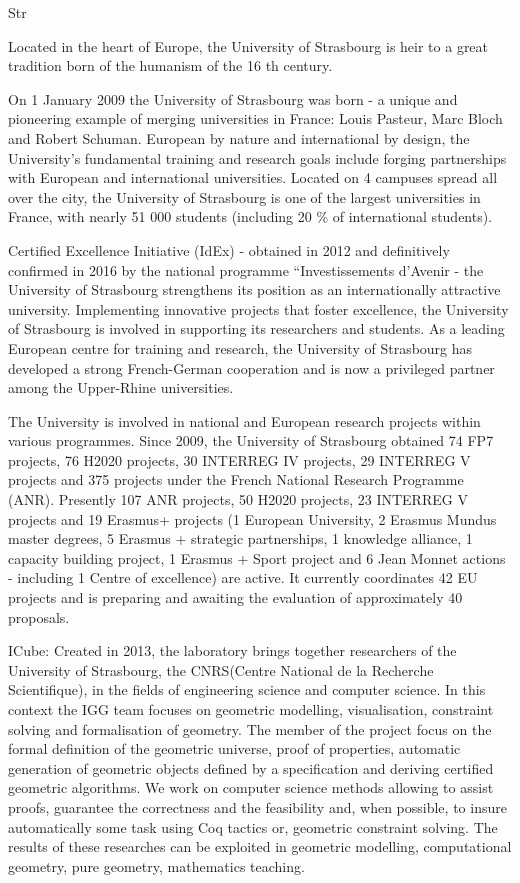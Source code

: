 \begin{sitedescription}{Str}


Located in the heart of Europe, the University of Strasbourg is heir to a great tradition born of
the humanism of the 16 th century.

On 1 January 2009 the University of Strasbourg was born - a unique and pioneering
example of merging universities in France: Louis Pasteur, Marc Bloch and Robert Schuman.
European by nature and international by design, the University’s fundamental training and
research goals include forging partnerships with European and international universities.
Located on 4 campuses spread all over the city, the University of Strasbourg is one of the
largest universities in France, with nearly 51 000 students (including 20 \% of international
students).

Certified Excellence Initiative (IdEx) - obtained in 2012 and definitively confirmed in 2016
by the national programme “Investissements d’Avenir - the University of Strasbourg
strengthens its position as an internationally attractive university. Implementing innovative
projects that foster excellence, the University of Strasbourg is involved in supporting its
researchers and students.
As a leading European centre for training and research, the University of Strasbourg has
developed a strong French-German cooperation and is now a privileged partner among the
Upper-Rhine universities.

The University is involved in national and European research projects within various
programmes. Since 2009, the University of Strasbourg obtained 74 FP7 projects, 76 H2020
projects, 30 INTERREG IV projects, 29 INTERREG V projects and 375 projects under the
French National Research Programme (ANR). Presently 107 ANR projects, 50 H2020
projects, 23 INTERREG V projects and 19 Erasmus+ projects (1 European University, 2
Erasmus Mundus master degrees, 5 Erasmus + strategic partnerships, 1 knowledge alliance, 1
capacity building project, 1 Erasmus + Sport project and 6 Jean Monnet actions - including 1
Centre of excellence) are active. It currently coordinates 42 EU projects and is preparing and
awaiting the evaluation of approximately 40 proposals.

ICube: Created in 2013, the laboratory brings together researchers of the University of Strasbourg, the CNRS(Centre National de la Recherche Scientifique), in the fields of engineering science and computer science.
In this context the IGG team focuses on geometric modelling, visualisation, constraint solving and formalisation of geometry. The member of the project focus on the formal definition of the geometric universe, proof of properties, automatic generation of geometric objects defined by a specification and deriving certified geometric algorithms. We work on computer science methods allowing to assist proofs, guarantee the correctness and the feasibility and, when possible, to insure automatically some task using Coq tactics or, geometric constraint solving. The results of these researches can be exploited in geometric modelling, computational geometry, pure geometry, mathematics teaching.


\end{sitedescription}
